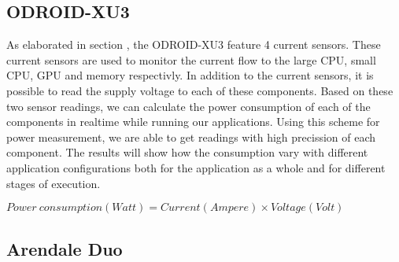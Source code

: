 \subsection{ODROID-XU3}
As elaborated in section , the ODROID-XU3 feature 4 current sensors.
These current sensors are used to monitor the current flow to the large CPU, small CPU, GPU and memory respectivly.
In addition to the current sensors, it is possible to read the supply voltage to each of these components.
Based on these two sensor readings, we can calculate the power consumption of each of the components in realtime while running our applications.
Using this scheme for power measurement, we are able to get readings with high precission of each component.
The results will show how the consumption vary with different application configurations both for the application as a whole and for different stages of execution.

$ Power\ consumption (Watt) = Current (Ampere) \times Voltage (Volt) $

\subsection{Arendale Duo}

